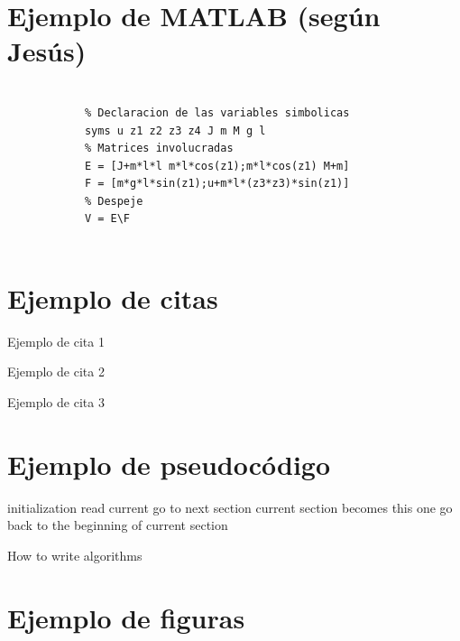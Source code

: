     \section{Ejemplo de MATLAB (según Jesús)}


        \begin{lstlisting}[frame=single]
        
            % Declaracion de las variables simbolicas
            syms u z1 z2 z3 z4 J m M g l 
            % Matrices involucradas
            E = [J+m*l*l m*l*cos(z1);m*l*cos(z1) M+m] 
            F = [m*g*l*sin(z1);u+m*l*(z3*z3)*sin(z1)] 
            % Despeje
            V = E\F
            
        \end{lstlisting}


    \section{Ejemplo de citas}

        Ejemplo de cita 1 \cite{latex}


        Ejemplo de cita 2 \cite{prime-number-theorem}
        
        
        Ejemplo de cita 3 \cite{WinNT}

    \section{Ejemplo de pseudocódigo}

        \begin{algorithm}[H]
            initialization\;
            {
                read current\;
                {
                   go to next section\;
                   current section becomes this one\;
                }
                {
                   go back to the beginning of current section\;
                }
            }
            \caption{How to write algorithms}
        \end{algorithm}

    \section{Ejemplo de figuras}

